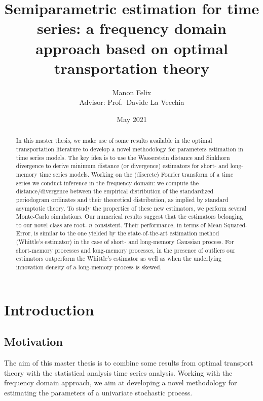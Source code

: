 \documentclass[
  11pt,
]{article}
\title{Semiparametric estimation for time series: a frequency domain
approach based on optimal transportation theory}
\author{Manon Felix\\
Advisor: Prof.~Davide La Vecchia}
\date{May 2021}
\begin{document}
\maketitle
\begin{abstract}
In this master thesis, we make use of some results available in the
optimal transportation literature to develop a novel methodology for
parameters estimation in time series models. The key idea is to use the
Wasserstein distance and Sinkhorn divergence to derive minimum distance
(or divergence) estimators for short- and long-memory time series
models. Working on the (discrete) Fourier transform of a time series we
conduct inference in the frequency domain: we compute the
distance/divergence between the empirical distribution of the
standardized periodogram ordinates and their theoretical distribution,
as implied by standard asymptotic theory. To study the properties of
these new estimators, we perform several Monte-Carlo simulations. Our
numerical results suggest that the estimators belonging to our novel
class are root- \(n\) consistent. Their performance, in terms of Mean
Squared-Error, is similar to the one yielded by the state-of-the-art
estimation method (Whittle's estimator) in the case of short- and
long-memory Gaussian process. For short-memory processes and long-memory
processes, in the presence of outliers our estimators outperform the
Whittle's estimator as well as when the underlying innovation density of
a long-memory process is skewed.
\end{abstract}

\newpage

\tableofcontents

\newpage

\hypertarget{introduction}{%
\section{Introduction}\label{introduction}}

\hypertarget{motivation}{%
\subsection{Motivation}\label{motivation}}

The aim of this master thesis is to combine some results from optimal
transport theory with the statistical analysis time series analysis.
Working with the frequency domain approach, we aim at developing a novel
methodology for estimating the parameters of a univariate stochastic
process.
\end{document}
